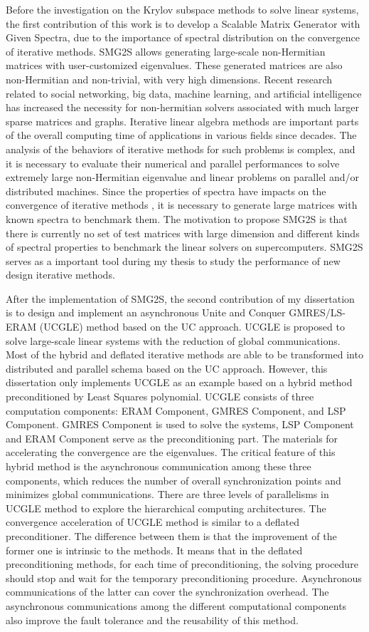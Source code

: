 Before the investigation on the Krylov subspace methods to solve linear systems, the first contribution of this work is to develop a Scalable Matrix Generator with Given Spectra, due to the importance of spectral distribution on the convergence of iterative methods. SMG2S allows generating large-scale non-Hermitian matrices with user-customized eigenvalues. These generated matrices are also non-Hermitian and non-trivial, with very high dimensions. Recent research related to social networking, big data, machine learning, and artificial intelligence has increased the necessity for non-hermitian solvers associated with much larger sparse matrices and graphs. Iterative linear algebra methods are important parts of the overall computing time of applications in various fields since decades. The analysis of the behaviors of iterative methods for such problems is complex, and it is necessary to evaluate their numerical and parallel performances to solve extremely large non-Hermitian eigenvalue and linear problems on parallel and/or distributed machines. Since the properties of spectra have impacts on the convergence of iterative methods , it is necessary to generate large matrices with known spectra to benchmark them. The motivation to propose SMG2S is that there is currently no set of test matrices with large dimension and different kinds of spectral properties to benchmark the linear solvers on supercomputers. SMG2S serves as a important tool during my thesis to study the performance of new design iterative methods.

After the implementation of SMG2S, the second contribution of my dissertation is to design and implement an asynchronous Unite and Conquer GMRES/LS-ERAM (UCGLE) method based on the UC approach. UCGLE is proposed to solve large-scale linear systems with the reduction of global communications. Most of the hybrid and deflated iterative methods are able to be transformed into distributed and parallel schema based on the UC approach. However, this dissertation only implements UCGLE as an example based on a hybrid method preconditioned by Least Squares polynomial. UCGLE consists of three computation components: ERAM Component, GMRES Component, and LSP Component. GMRES Component is used to solve the systems, LSP Component and ERAM Component serve as the preconditioning part. The materials for accelerating the convergence are the eigenvalues. The critical feature of this hybrid method is the asynchronous communication among these three components, which reduces the number of overall synchronization points and minimizes global communications. There are three levels of parallelisms in UCGLE method to explore the hierarchical computing architectures. The convergence acceleration of UCGLE method is similar to a deflated preconditioner. The difference between them is that the improvement of the former one is intrinsic to the methods. It means that in the deflated preconditioning methods, for each time of preconditioning, the solving procedure should stop and wait for the temporary preconditioning procedure. Asynchronous communications of the latter can cover the synchronization overhead. The asynchronous communications among the different computational components also improve the fault tolerance and the reusability of this method. 

